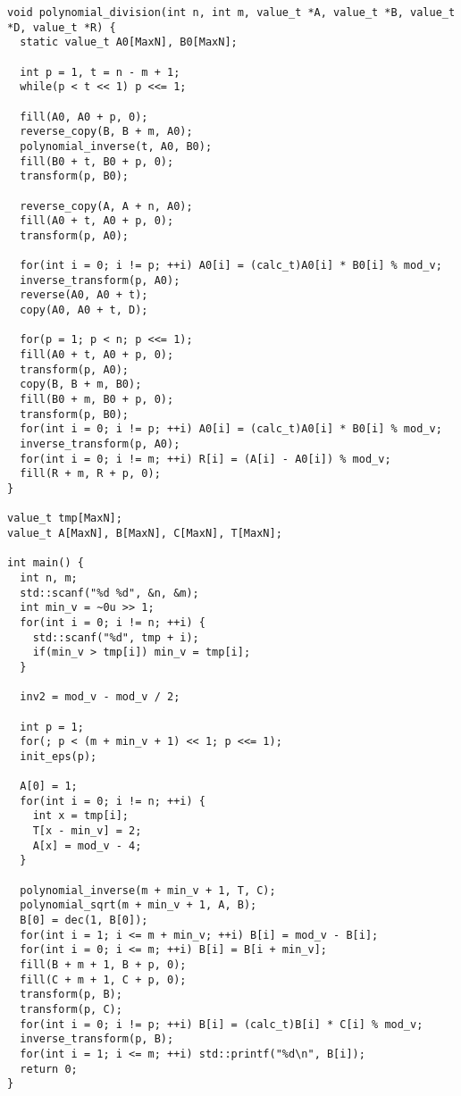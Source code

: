 \begin{verbatim}
void polynomial_division(int n, int m, value_t *A, value_t *B, value_t *D, value_t *R) {
  static value_t A0[MaxN], B0[MaxN];

  int p = 1, t = n - m + 1;
  while(p < t << 1) p <<= 1;

  fill(A0, A0 + p, 0);
  reverse_copy(B, B + m, A0);
  polynomial_inverse(t, A0, B0);
  fill(B0 + t, B0 + p, 0);
  transform(p, B0);

  reverse_copy(A, A + n, A0);
  fill(A0 + t, A0 + p, 0);
  transform(p, A0);

  for(int i = 0; i != p; ++i) A0[i] = (calc_t)A0[i] * B0[i] % mod_v;
  inverse_transform(p, A0);
  reverse(A0, A0 + t);
  copy(A0, A0 + t, D);

  for(p = 1; p < n; p <<= 1);
  fill(A0 + t, A0 + p, 0);
  transform(p, A0);
  copy(B, B + m, B0);
  fill(B0 + m, B0 + p, 0);
  transform(p, B0);
  for(int i = 0; i != p; ++i) A0[i] = (calc_t)A0[i] * B0[i] % mod_v;
  inverse_transform(p, A0);
  for(int i = 0; i != m; ++i) R[i] = (A[i] - A0[i]) % mod_v;
  fill(R + m, R + p, 0);
}

value_t tmp[MaxN];
value_t A[MaxN], B[MaxN], C[MaxN], T[MaxN];

int main() {
  int n, m;
  std::scanf("%d %d", &n, &m);
  int min_v = ~0u >> 1;
  for(int i = 0; i != n; ++i) {
    std::scanf("%d", tmp + i);
    if(min_v > tmp[i]) min_v = tmp[i];
  }

  inv2 = mod_v - mod_v / 2;

  int p = 1;
  for(; p < (m + min_v + 1) << 1; p <<= 1);
  init_eps(p);

  A[0] = 1;
  for(int i = 0; i != n; ++i) {
    int x = tmp[i];
    T[x - min_v] = 2;
    A[x] = mod_v - 4;
  }

  polynomial_inverse(m + min_v + 1, T, C);
  polynomial_sqrt(m + min_v + 1, A, B);
  B[0] = dec(1, B[0]);
  for(int i = 1; i <= m + min_v; ++i) B[i] = mod_v - B[i];
  for(int i = 0; i <= m; ++i) B[i] = B[i + min_v];
  fill(B + m + 1, B + p, 0);
  fill(C + m + 1, C + p, 0);
  transform(p, B);
  transform(p, C);
  for(int i = 0; i != p; ++i) B[i] = (calc_t)B[i] * C[i] % mod_v;
  inverse_transform(p, B);
  for(int i = 1; i <= m; ++i) std::printf("%d\n", B[i]);
  return 0;
}
\end{verbatim}

